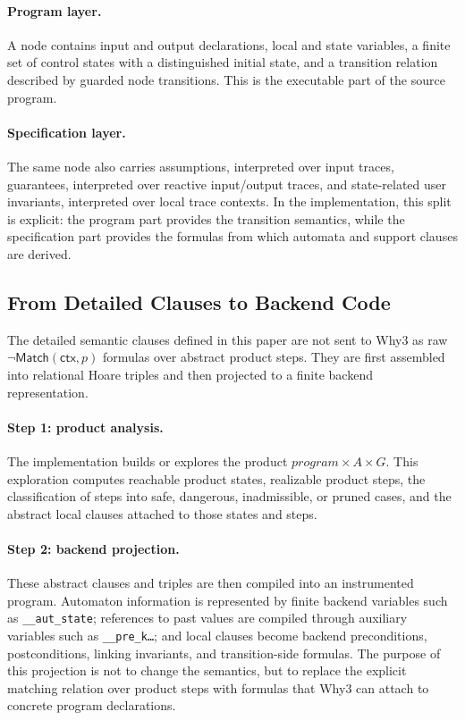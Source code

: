 \documentclass[11pt,a4paper]{article}
\newcommand{\Match}{\mathsf{Match}}
\newcommand{\ctx}{\mathsf{ctx}}
\begin{document}
\paragraph{Program layer.}
A node contains input and output declarations, local and state variables, a
finite set of control states with a distinguished initial state, and a
transition relation described by guarded node transitions. This is the
executable part of the source program.

\paragraph{Specification layer.}
The same node also carries assumptions, interpreted over input traces,
guarantees, interpreted over reactive input/output traces, and state-related
user invariants, interpreted over local trace contexts. In the implementation,
this split is explicit: the program part provides the transition semantics,
while the specification part provides the formulas from which automata and
support clauses are derived.

\subsection{From Detailed Clauses to Backend Code}

The detailed semantic clauses defined in this paper are not sent to Why3 as raw
\(\neg \Match(\ctx,p)\) formulas over abstract product steps. They are first
assembled into relational Hoare triples and then projected to a finite backend
representation.

\paragraph{Step 1: product analysis.}
The implementation builds or explores the product
\(program \times A \times G\). This exploration computes reachable product
states, realizable product steps, the classification of steps into safe,
dangerous, inadmissible, or pruned cases, and the abstract local clauses
attached to those states and steps.

\paragraph{Step 2: backend projection.}
These abstract clauses and triples are then compiled into an instrumented
program. Automaton information is represented by finite backend variables such
as \texttt{\_\_aut\_state}; references to past values are compiled through
auxiliary variables such as \texttt{\_\_pre\_k\ldots}; and local clauses
become backend preconditions, postconditions, linking invariants, and
transition-side formulas.
The purpose of this projection is not to change the semantics, but to replace
the explicit matching relation over product steps with formulas that Why3 can
attach to concrete program declarations.
\end{document}
